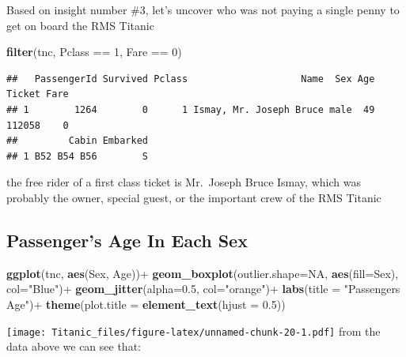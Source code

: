 \documentclass[
]{article}
\newenvironment{Shaded}{\begin{snugshade}}{\end{snugshade}}
\newcommand{\AttributeTok}[1]{\textcolor[rgb]{0.74,0.68,0.62}{#1}}
\newcommand{\ConstantTok}[1]{\textcolor[rgb]{0.74,0.68,0.62}{#1}}
\newcommand{\DecValTok}[1]{\textcolor[rgb]{0.27,0.67,0.26}{#1}}
\newcommand{\FloatTok}[1]{\textcolor[rgb]{0.27,0.67,0.26}{#1}}
\newcommand{\FunctionTok}[1]{\textcolor[rgb]{1.00,0.58,0.35}{\textbf{#1}}}
\newcommand{\NormalTok}[1]{\textcolor[rgb]{0.74,0.68,0.62}{#1}}
\newcommand{\SpecialCharTok}[1]{\textcolor[rgb]{0.02,0.61,0.04}{#1}}
\newcommand{\StringTok}[1]{\textcolor[rgb]{0.02,0.61,0.04}{#1}}
\begin{document}
Based on insight number \#3, let's uncover who was not paying a single
penny to get on board the RMS Titanic

\begin{Shaded}
\begin{Highlighting}[]
\FunctionTok{filter}\NormalTok{(tnc, Pclass }\SpecialCharTok{==} \DecValTok{1}\NormalTok{, Fare }\SpecialCharTok{==} \DecValTok{0}\NormalTok{)}
\end{Highlighting}
\end{Shaded}

\begin{verbatim}
##   PassengerId Survived Pclass                    Name  Sex Age Ticket Fare
## 1        1264        0      1 Ismay, Mr. Joseph Bruce male  49 112058    0
##         Cabin Embarked
## 1 B52 B54 B56        S
\end{verbatim}

the free rider of a first class ticket is Mr.~Joseph Bruce Ismay, which
was probably the owner, special guest, or the important crew of the RMS
Titanic

\hypertarget{passengers-age-in-each-sex}{%
\subsection{Passenger's Age In Each
Sex}\label{passengers-age-in-each-sex}}

\begin{Shaded}
\begin{Highlighting}[]
\FunctionTok{ggplot}\NormalTok{(tnc, }\FunctionTok{aes}\NormalTok{(Sex, Age))}\SpecialCharTok{+}
  \FunctionTok{geom\_boxplot}\NormalTok{(}\AttributeTok{outlier.shape=}\ConstantTok{NA}\NormalTok{, }\FunctionTok{aes}\NormalTok{(}\AttributeTok{fill=}\NormalTok{Sex), }\AttributeTok{col=}\StringTok{"Blue"}\NormalTok{)}\SpecialCharTok{+}
  \FunctionTok{geom\_jitter}\NormalTok{(}\AttributeTok{alpha=}\FloatTok{0.5}\NormalTok{, }\AttributeTok{col=}\StringTok{"orange"}\NormalTok{)}\SpecialCharTok{+}
  \FunctionTok{labs}\NormalTok{(}\AttributeTok{title =} \StringTok{"Passengers Age"}\NormalTok{)}\SpecialCharTok{+}
  \FunctionTok{theme}\NormalTok{(}\AttributeTok{plot.title =} \FunctionTok{element\_text}\NormalTok{(}\AttributeTok{hjust =} \FloatTok{0.5}\NormalTok{))}
\end{Highlighting}
\end{Shaded}

\texttt{[image: Titanic\_files/figure-latex/unnamed-chunk-20-1.pdf]} from
the data above we can see that:
\end{document}
